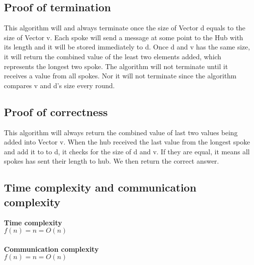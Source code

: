 \documentclass[12pt,letterpaper]{article}
\begin{document}
\subsection* {Proof of termination}
This algorithm will and always terminate once the size of Vector d equals to the size of Vector v. Each spoke will send a message at some point to the Hub with its length and it will be stored immediately to d. Once d and v has the same size, it will return the combined value of the least two elements added, which represents the longest two spoke. The algorithm will not terminate until it receives a value from all spokes. Nor it will not terminate since the algorithm compares v and d's size every round.
\subsection* {Proof of correctness}
This algorithm will always return the combined value of last two values being added into Vector v. When the hub received the last value from the longest spoke and add it to to d, it checks for the size of d and v. If they are equal, it means all spokes has sent their length to hub. We then return the correct answer.
\subsection* {Time complexity and communication complexity}
\textbf{Time complexity} \\
$f(n) = n = O(n)$ \\ \\
\textbf{Communication complexity} \\
$f(n) = n = O(n)$ \\ \\
\end{document}
